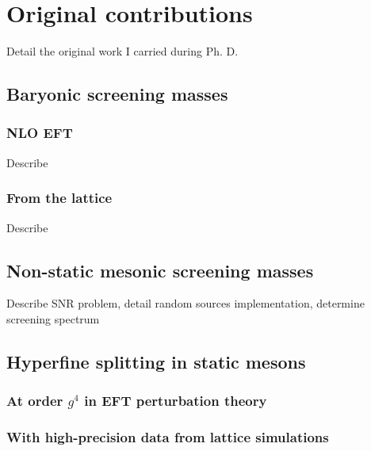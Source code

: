 \chapter{Original contributions}

Detail the original work I carried during Ph. D.
\section{Baryonic screening masses}
\subsection{NLO EFT}
Describe \cite{BaryonNlo}
\subsection{From the lattice}
Describe \cite{BaryonLattice} 
\section{Non-static mesonic screening masses}
Describe SNR problem, detail random sources implementation, determine screening
spectrum
\section{Hyperfine splitting in static mesons}
\subsection{At order $g^4$ in EFT perturbation theory}
\subsection{With high-precision data from lattice simulations}
